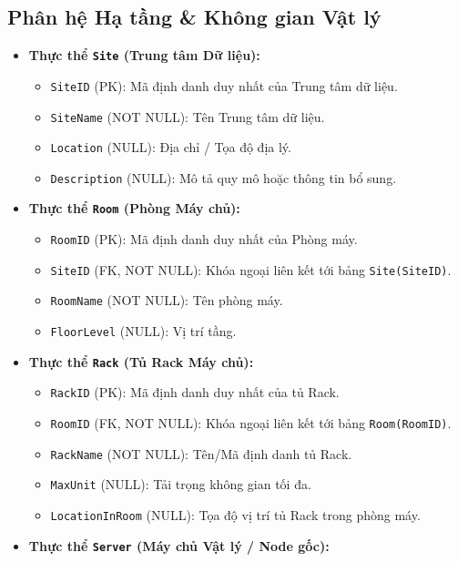 \subsection{Phân hệ Hạ tầng \& Không gian Vật lý}
\begin{itemize}[leftmargin=2em]
    \item \textbf{Thực thể \texttt{Site} (Trung tâm Dữ liệu):}
    \begin{itemize}
        \item \texttt{SiteID} (PK): Mã định danh duy nhất của Trung tâm dữ liệu.
        \item \texttt{SiteName} (NOT NULL): Tên Trung tâm dữ liệu.
        \item \texttt{Location} (NULL): Địa chỉ / Tọa độ địa lý.
        \item \texttt{Description} (NULL): Mô tả quy mô hoặc thông tin bổ sung.
    \end{itemize}
    \item \textbf{Thực thể \texttt{Room} (Phòng Máy chủ):}
    \begin{itemize}
        \item \texttt{RoomID} (PK): Mã định danh duy nhất của Phòng máy.
        \item \texttt{SiteID} (FK, NOT NULL): Khóa ngoại liên kết tới bảng \texttt{Site(SiteID)}.
        \item \texttt{RoomName} (NOT NULL): Tên phòng máy.
        \item \texttt{FloorLevel} (NULL): Vị trí tầng.
    \end{itemize}
    \item \textbf{Thực thể \texttt{Rack} (Tủ Rack Máy chủ):}
    \begin{itemize}
        \item \texttt{RackID} (PK): Mã định danh duy nhất của tủ Rack.
        \item \texttt{RoomID} (FK, NOT NULL): Khóa ngoại liên kết tới bảng \texttt{Room(RoomID)}.
        \item \texttt{RackName} (NOT NULL): Tên/Mã định danh tủ Rack.
        \item \texttt{MaxUnit} (NULL): Tải trọng không gian tối đa.
        \item \texttt{LocationInRoom} (NULL): Tọa độ vị trí tủ Rack trong phòng máy.
    \end{itemize}
    \item \textbf{Thực thể \texttt{Server} (Máy chủ Vật lý / Node gốc):}
    \begin{itemize}

\end{itemize}
\end{itemize}
